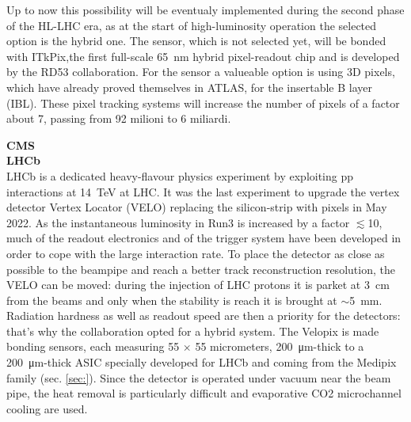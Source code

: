         Up to now this possibility will be eventualy implemented during the second phase of the HL-LHC era, as at the start of high-luminosity operation the selected option is the hybrid one. The sensor, which is not selected yet, will be bonded with ITkPix,the first full-scale \SI{65}{nm} hybrid pixel-readout chip and is developed by the RD53 collaboration.
        For the sensor a valueable option is using 3D pixels, which have already proved themselves in ATLAS, for the insertable B layer (IBL).
        These pixel tracking systems will increase the number of pixels of a factor about 7, passing from 92 milioni to 6 miliardi. 

        \vspace{5mm}
        
        \textbf{CMS}\\

        \vspace{5mm}
        \textbf{LHCb} \\
        LHCb is a dedicated heavy-flavour physics experiment by exploiting pp interactions at \SI{14}{TeV} at LHC. 
        It was the last experiment to upgrade the vertex detector Vertex Locator (VELO) replacing the silicon-strip with pixels in May 2022. 
        As the instantaneous luminosity in Run3 is increased by a factor $\lesssim$10, much of the readout electronics and of the trigger system have been developed in order to cope with the large interaction rate.
        To place the detector as close as possible to the beampipe and reach a better track reconstruction resolution, the VELO can be moved: during the injection of LHC protons it is parket at \SI{3}{cm} from the beams and only when the stability is reach it is brought at $\sim$\SI{5}{mm}. Radiation hardness as well as readout speed are then a priority for the detectors: that's why the collaboration opted for a hybrid system. 
        The Velopix is made bonding sensors, each measuring 55 $\times$ 55 micrometers, \SI{200}{\um}-thick to a \SI{200}{\um}-thick ASIC specially developed for LHCb and coming from the Medipix family (sec. \ref{sec:}).
        Since the detector is operated under vacuum near the beam pipe, the heat removal is particularly difficult and evaporative CO2 microchannel cooling are used. 

